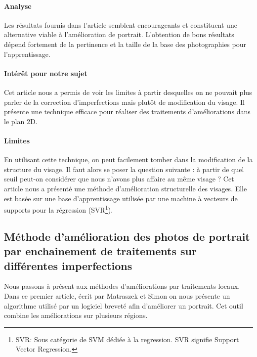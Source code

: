 \documentclass[11pt, french,screen]{report-rd-info}
\begin{document}
\paragraph{Analyse}
Les résultats fournis dans l’article semblent encourageants et constituent une alternative viable à l’amélioration de portrait. L’obtention de bons résultats dépend fortement de la pertinence et la taille de la base des photographies pour l’apprentissage.
\paragraph{Intérêt pour notre sujet}
Cet article nous a permis de voir les limites à partir desquelles on ne pouvait plus parler de la correction d’imperfections mais plutôt de modification du visage. Il présente une technique efficace pour réaliser des traitements d’améliorations dans le plan 2D.
\paragraph{Limites}
En utilisant cette technique, on peut facilement tomber dans la modification de la structure du visage. Il faut alors se poser la question suivante : à partir de quel seuil peut-on considérer que nous n’avons plus affaire au même visage ?
Cet article nous a présenté une méthode d’amélioration structurelle des visages. Elle est basée sur une base d’apprentissage utilisée par une machine à vecteurs de supports pour la régression (SVR\footnote{SVR: Sous catégorie de SVM dédiée à la regression. SVR signifie Support Vector Regression.}).
\subsection{Méthode d’amélioration des photos de portrait par enchainement de traitements sur différentes imperfections}
Nous passons à présent aux méthodes d’améliorations par traitements locaux. Dans ce premier article, écrit par Matraszek et Simon\cite{Matraszek2004} on nous présente un algorithme utilisé par un logiciel breveté afin d'améliorer un portrait. Cet outil combine les améliorations sur plusieurs régions.
\end{document}
